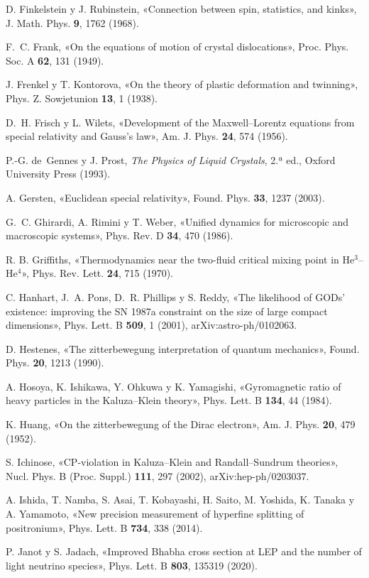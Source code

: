 \documentclass[11pt,a4paper]{article}
\begin{document}
\begin{list}{}{\setlength{\leftmargin}{1.5em}\setlength{\itemindent}{-1.5em}\setlength{\itemsep}{0.15em}\small}
\item D. Finkelstein y J. Rubinstein, «Connection between spin, statistics, and kinks», J. Math. Phys. \textbf{9}, 1762 (1968).
\item F.~C. Frank, «On the equations of motion of crystal dislocations», Proc. Phys. Soc. A \textbf{62}, 131 (1949).
\item J. Frenkel y T. Kontorova, «On the theory of plastic deformation and twinning», Phys. Z. Sowjetunion \textbf{13}, 1 (1938).
\item D.~H. Frisch y L. Wilets, «Development of the Maxwell--Lorentz equations from special relativity and Gauss's law», Am. J. Phys. \textbf{24}, 574 (1956).
\item P.-G. de~Gennes y J. Prost, \emph{The Physics of Liquid Crystals}, 2.ª ed., Oxford University Press (1993).
\item A. Gersten, «Euclidean special relativity», Found. Phys. \textbf{33}, 1237 (2003).
\item G.~C. Ghirardi, A. Rimini y T. Weber, «Unified dynamics for microscopic and macroscopic systems», Phys. Rev. D \textbf{34}, 470 (1986).
\item R. B. Griffiths, «Thermodynamics near the two-fluid critical mixing point in He$^3$--He$^4$», Phys. Rev. Lett. \textbf{24}, 715 (1970).
\item C. Hanhart, J.~A. Pons, D.~R. Phillips y S. Reddy, «The likelihood of GODs' existence: improving the SN 1987a constraint on the size of large compact dimensions», Phys. Lett. B \textbf{509}, 1 (2001), arXiv:astro-ph/0102063.
\item D. Hestenes, «The zitterbewegung interpretation of quantum mechanics», Found. Phys. \textbf{20}, 1213 (1990).
\item A. Hosoya, K. Ishikawa, Y. Ohkuwa y K. Yamagishi, «Gyromagnetic ratio of heavy particles in the Kaluza--Klein theory», Phys. Lett. B \textbf{134}, 44 (1984).
\item K. Huang, «On the zitterbewegung of the Dirac electron», Am. J. Phys. \textbf{20}, 479 (1952).
\item S. Ichinose, «CP-violation in Kaluza--Klein and Randall--Sundrum theories», Nucl. Phys. B (Proc. Suppl.) \textbf{111}, 297 (2002), arXiv:hep-ph/0203037.
\item A. Ishida, T. Namba, S. Asai, T. Kobayashi, H. Saito, M. Yoshida, K. Tanaka y A. Yamamoto, «New precision measurement of hyperfine splitting of positronium», Phys. Lett. B \textbf{734}, 338 (2014).
\item P. Janot y S. Jadach, «Improved Bhabha cross section at LEP and the number of light neutrino species», Phys. Lett. B \textbf{803}, 135319 (2020).

\end{list}
\end{document}
